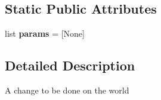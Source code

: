 \subsection*{\-Static \-Public \-Attributes}
\begin{DoxyCompactItemize}
\item 
\hypertarget{classshared_1_1orders_1_1_order_acbc4c52c38a888ea233ba689529a97a6}{list {\bfseries params} = \mbox{[}\-None\mbox{]}}\label{classshared_1_1orders_1_1_order_acbc4c52c38a888ea233ba689529a97a6}

\end{DoxyCompactItemize}


\subsection{\-Detailed \-Description}
\begin{DoxyVerb}A change to be done on the world\end{DoxyVerb}
 

